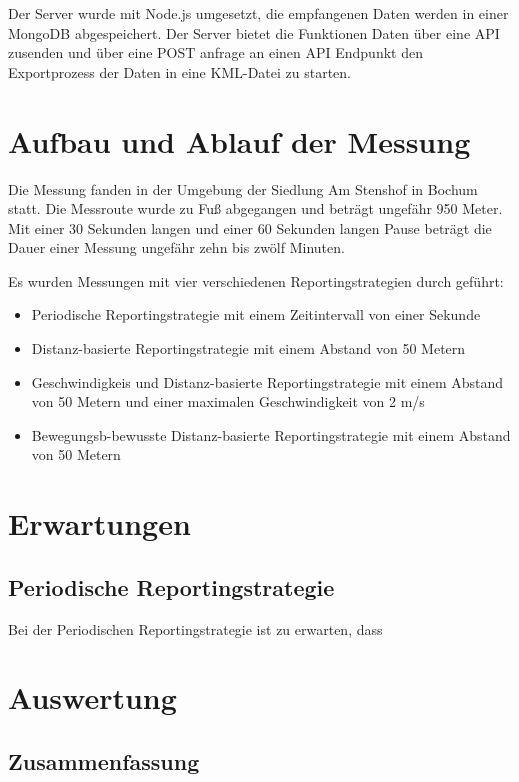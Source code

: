 Der Server wurde mit Node.js umgesetzt, die empfangenen Daten werden in einer MongoDB abgespeichert. Der Server bietet die Funktionen Daten über eine API zusenden und über eine POST anfrage an einen API Endpunkt den Exportprozess der Daten in eine KML-Datei zu starten.

\section{Aufbau und Ablauf der Messung}
Die Messung fanden in der Umgebung der Siedlung Am Stenshof in Bochum statt. Die Messroute wurde zu Fuß abgegangen und beträgt ungefähr 950 Meter. Mit einer 30 Sekunden langen und einer 60 Sekunden langen Pause beträgt die Dauer einer Messung ungefähr zehn bis zwölf Minuten.

Es wurden Messungen mit vier verschiedenen Reportingstrategien durch geführt:
\begin{itemize}
	\item{Periodische Reportingstrategie mit einem Zeitintervall von einer Sekunde}
	\item{Distanz-basierte Reportingstrategie mit einem Abstand von 50 Metern}
	\item{Geschwindigkeis und Distanz-basierte Reportingstrategie mit einem Abstand von 50 Metern und einer maximalen Geschwindigkeit von 2 m/s}
	\item{Bewegungsb-bewusste Distanz-basierte Reportingstrategie mit einem Abstand von 50 Metern}
\end{itemize}

\section{Erwartungen}
\subsection{Periodische Reportingstrategie}
Bei der Periodischen Reportingstrategie ist zu erwarten, dass 

\section{Auswertung}	


\subsection{Zusammenfassung}

	

